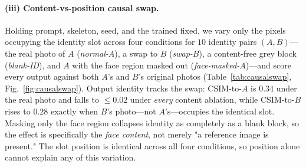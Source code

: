 \paragraph{(iii) Content-vs-position causal swap.} Holding prompt, skeleton,
seed, and the trained \gate{} fixed, we vary only the pixels occupying the
identity slot across four conditions for $10$ identity pairs $(A,B)$---the real
photo of $A$ (\emph{normal-$A$}), a swap to $B$ (\emph{swap-$B$}), a
content-free grey block (\emph{blank-ID}), and $A$ with the face region masked
out (\emph{face-masked-$A$})---and score every output against both $A$'s and
$B$'s original photos (Table~\ref{tab:causalswap}, Fig.~\ref{fig:causalswap}).
Output identity tracks the swap: CSIM-to-$A$ is $0.34$ under the real photo and
falls to $\leq\!0.02$ under \emph{every} content ablation, while CSIM-to-$B$
rises to $0.28$ exactly when $B$'s photo---not $A$'s---occupies the identical
slot. Masking only the face region collapses identity as completely as a blank
block, so the effect is specifically the \emph{face content}, not merely "a
reference image is present." The slot position is identical across all four
conditions, so position alone cannot explain any of this variation.

\begin{table}[t]\centering\small
\setlength{\tabcolsep}{5pt}
\caption[Content-vs-position causal swap]{\textbf{Content-vs-position causal swap} (mean AdaFace cosine over
detected faces; identical prompt/skeleton/seed/\gate{} across all four
conditions, only the identity-slot pixels vary). Identity follows reference
\emph{content}: CSIM-to-$A$ is high only under \emph{normal-$A$}, CSIM-to-$B$
is high only under \emph{swap-$B$}, and both collapse under \emph{blank-ID}
and \emph{face-masked-$A$}---ruling out slot position as the explanation.}
\label{tab:causalswap}
\end{table}

